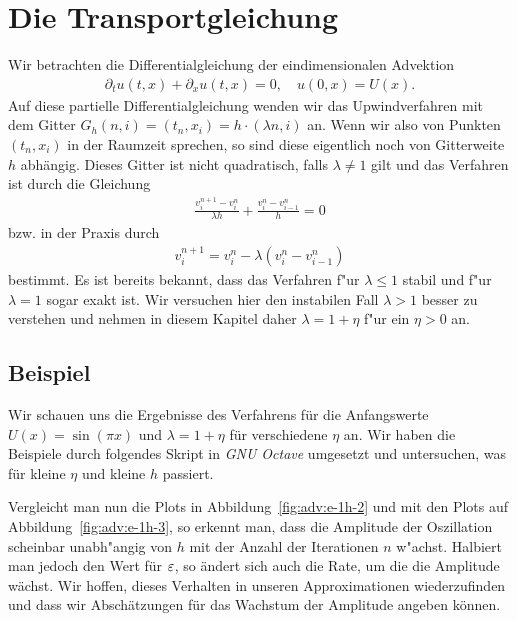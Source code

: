 \section{Die Transportgleichung}

Wir betrachten die Differentialgleichung der eindimensionalen Advektion
\begin{align}\label{eq:adv:pde}
\partial_t u(t, x) + \partial_x u(t, x) = 0, \quad u(0, x) = U(x).
\end{align}
Auf diese partielle Differentialgleichung wenden wir das Upwindverfahren mit dem Gitter $G_h(n,i) = (t_n, x_i) = h \cdot (\lambda n, i)$ an.
Wenn wir also von Punkten $(t_n, x_i)$ in der Raumzeit sprechen, so sind diese eigentlich noch von Gitterweite $h$ abhängig. 
Dieses Gitter ist nicht quadratisch, falls $\lambda \neq 1$ gilt und das Verfahren ist durch die Gleichung
\begin{align}\label{eq:adv:scheme_rechnung}
\frac {v^{n+1}_i - v^n_i} {\lambda h} + \frac {v^n_i - v^n_{i-1}} h = 0
\end{align}
bzw. in der Praxis durch
\begin{align}\label{eq:adv:scheme}
v^{n+1}_i = v^n_i - \lambda (v^n_i - v^n_{i-1})
\end{align}
bestimmt.
Es ist bereits bekannt, dass das Verfahren f"ur $\lambda \leq 1$ stabil und f"ur $\lambda = 1$ sogar exakt ist.
Wir versuchen hier den instabilen Fall $\lambda > 1$ besser zu verstehen und nehmen in diesem Kapitel daher $\lambda = 1 + \eta$ f"ur ein $\eta > 0$ an.



\subsection{Beispiel}

Wir schauen uns die Ergebnisse des Verfahrens für die Anfangswerte $U(x) = \sin(\pi x)$ und $\lambda = 1 + \eta$ für verschiedene $\eta$ an.
Wir haben die Beispiele durch folgendes Skript in \emph{GNU Octave} umgesetzt und untersuchen, was für kleine $\eta$ und kleine $h$ passiert.




Vergleicht man nun die Plots in Abbildung~\ref{fig:adv:e-1h-2} und mit den Plots auf Abbildung~\ref{fig:adv:e-1h-3}, so erkennt man, dass die Amplitude der Oszillation scheinbar unabh"angig von $h$ mit der Anzahl der Iterationen $n$ w"achst.
Halbiert man jedoch den Wert für $\varepsilon$, so ändert sich auch die Rate, um die die Amplitude wächst.
Wir hoffen, dieses Verhalten in unseren Approximationen wiederzufinden und dass wir Abschätzungen für das Wachstum der Amplitude angeben können.



